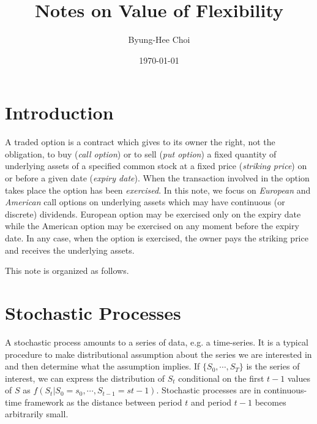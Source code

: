 \documentclass[11pt,letter]{article}
\theoremstyle{definition}
\theoremstyle{remark}
\numberwithin{equation}{section}
\begin{document}
\title{Notes on Value of Flexibility}
\author{Byung-Hee Choi}%
\date{\today}%

\maketitle
\section{Introduction}

A traded option is a contract which gives to its owner the right, not the obligation, to buy (\textit{call option}) or to sell (\textit{put option}) a fixed quantity of underlying assets of a specified common stock at a fixed price (\textit{striking price}) on or before a given date (\textit{expiry date}). When the transaction involved in the option takes place the option has been \textit{exercised}. In this note, we focus on \textit{European} and \textit{American} call options on underlying assets which may have continuous (or discrete) dividends. European option may be exercised only on the expiry date while the American option may be exercised on any moment before the expiry date. In any case, when the option is exercised, the owner pays the striking price and receives the underlying assets.

This note is organized as follows. %


\section{Stochastic Processes}
A stochastic process amounts to a series of data, e.g. a time-series. It is a typical procedure to make distributional assumption about the series we are interested in and then determine what the assumption implies. If $\{S_0,\cdots,S_T\}$ is the series of interest, we can express the distribution of $S_t$ conditional on the first $t-1$ values of $S$ as $f(S_t|S_0=s_0,\cdots,S_{t-1}=s{t-1})$. Stochastic processes are in continuous-time framework as the distance between period $t$ and period $t-1$ becomes arbitrarily small.
\end{document}

